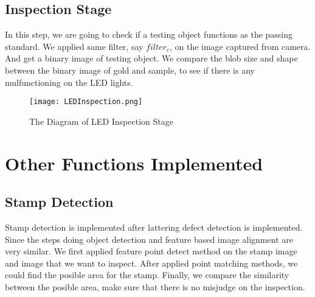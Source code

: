 	\subsection{Inspection Stage}
		In this step, we are going to check if a testing object functions as the passing standard.
		We applied same filter, say $filter_c$, on the image captured from camera. And get a binary image of testing object.
		We compare the blob size and shape between the binary image of gold and sample, to see if there is any mulfunctioning on the LED lights.
		\begin{figure}[h!]
			\texttt{[image: LEDInspection.png]}
			\caption{The Diagram of LED Inspection Stage}
			\label{fig:LEDInspection}
		\end{figure}

\section{Other Functions Implemented}
	\subsection{Stamp Detection}
		Stamp detection is implemented after lattering defect detection is implemented.
		Since the steps doing object detection and feature based image alignment are very similar.
		We first applied feature point detect method on the stamp image and image that we want to inspect.
		After applied point matching methods, we could find the posible area for the stamp.
		Finally, we compare the similarity between the posible area, make sure that there is no misjudge on the inspection.